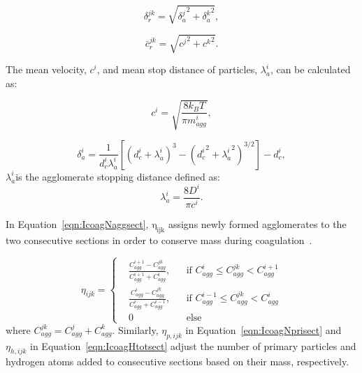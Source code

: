 \begin{equation}
	\delta^{jk}_r=
	\sqrt{
		{\delta^j_a}^2+{\delta^k_a}^2
	}
	\label{eqn:sqrtmeandist},
\end{equation}

\begin{equation}
	\bar{c}^{jk}_r=
	\sqrt{
		{c^j}^2+{c^k}^2
	}
	\label{eqn:sqrtmeanvel}.
\end{equation}

The mean velocity, ${c^i}$, and mean stop distance of particles, ${\lambda^i_a}$, can be calculated as:

\begin{equation}
	c^i = \sqrt{\frac{8k_B T}{\pi m^i_{agg}}},
	\label{eqn:meanvel}
\end{equation}

\begin{equation}
	\delta^i_a=\frac{1}{d^i_c\lambda^i_a}
	\left[
	\left(
	d^i_c+\lambda^i_a
	\right)^3
	-\left(
	{d^i_c}^2+{\lambda^i_a}^2
	\right)^{3 / 2}
	\right]
	-d^i_{c},
	\label{eqn:meandist}
\end{equation}
\noindent $\lambda^i_a $is the agglomerate stopping distance defined as:
\begin{equation}
	\lambda^i_a = \frac{8D^i}{\pi c^i}
	\label{eqn:stopdist}.
\end{equation}




In Equation~\eqref{eqn:IcoagNaggsect}, $\mathrm{\eta_{ijk}}$ assigns newly formed agglomerates to the two consecutive sections in order to conserve mass during coagulation~\citep{park2005aerosol}.

\begin{equation}
	\eta_{ijk}=
	\left\{
	\begin{aligned}
		&\frac{C^{i+1}_{agg}-C^{jk}_{agg}}{C^{i+1}_{agg}+C^i_{agg}},
		&&
		\text{if } C^i_{agg} \le C^{jk}_{agg} < C^{i+1}_{agg}
		\\
		&\frac{C^{i}_{agg}-C^{jk}_{agg}}{C^{i}_{agg}+C^{i-1}_{agg}}, 
		&&
		\text{if } C^{i-1}_{agg} \le C^{jk}_{agg} < C^{i}_{agg}
		\\
		&0
		&&\text{else}
	\end{aligned}
	\right.
	\label{eqn:etacoag}
\end{equation}
\noindent where ${C^{jk}_{agg}=C^{j}_{agg}+C^{k}_{agg}}$. Similarly, $\eta_{p,ijk}$ in Equation~\eqref{eqn:IcoagNprisect} and $\eta_{h,ijk}$ in Equation~\eqref{eqn:IcoagHtotsect} adjust the number of primary particles and hydrogen atoms added to consecutive sections based on their mass, respectively.

